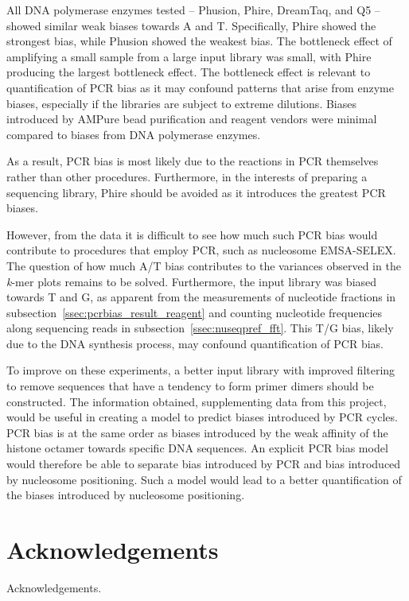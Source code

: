 \documentclass[parskip=full, numbers=noenddot]{scrbook}
\begin{document}
All DNA polymerase enzymes tested -- Phusion, Phire, DreamTaq, and Q5  -- showed similar weak biases towards A and T.  Specifically, Phire showed the strongest bias, while Phusion showed the weakest bias.  The bottleneck effect of amplifying a small sample from a large input library was small, with Phire producing the largest bottleneck effect.  The bottleneck effect is relevant to quantification of PCR bias as it may confound patterns that arise from enzyme biases, especially if the libraries are subject to extreme dilutions.  Biases introduced by AMPure bead purification and reagent vendors were minimal compared to biases from DNA polymerase enzymes.

As a result, PCR bias is most likely due to the reactions in PCR themselves rather than other procedures.  Furthermore, in the interests of preparing a sequencing library, Phire should be avoided as it introduces the greatest PCR biases.

However, from the data it is difficult to see how much such PCR bias would contribute to procedures that employ PCR, such as nucleosome EMSA-SELEX.  The question of how much A/T bias contributes to the variances observed in the \emph{k}-mer plots remains to be solved.  Furthermore, the input library was biased towards T and G, as apparent from the measurements of nucleotide fractions in subsection~\ref{ssec:pcrbias_result_reagent} and counting nucleotide frequencies along sequencing reads in subsection~\ref{ssec:nuseqpref_fft}.  This T/G bias, likely due to the DNA synthesis process, may confound quantification of PCR bias.

To improve on these experiments, a better input library with improved filtering to remove sequences that have a tendency to form primer dimers should be constructed.  The information obtained, supplementing data from this project, would be useful in creating a model to predict biases introduced by PCR cycles.  PCR bias is at the same order as biases introduced by the weak affinity of the histone octamer towards specific DNA sequences.  An explicit PCR bias model would therefore be able to separate bias introduced by PCR and bias introduced by nucleosome positioning.  Such a model would lead to a better quantification of the biases introduced by nucleosome positioning.

\backmatter

\chapter{Acknowledgements}
\label{ch:ack}

Acknowledgements.

\printbibliography
\end{document}
